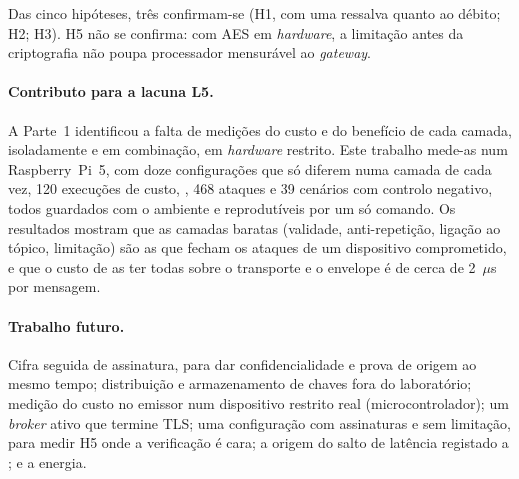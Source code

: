 
Das cinco hipóteses, três confirmam-se (H1, com uma ressalva quanto ao débito; H2;
H3).  H5 não se confirma: com
AES em \emph{hardware}, a limitação antes da criptografia não poupa processador
mensurável ao \emph{gateway}.

\paragraph{Contributo para a lacuna L5.} A Parte~1 identificou a falta de medições
do custo e do benefício de cada camada, isoladamente e em combinação, em
\emph{hardware} restrito. Este trabalho mede-as num Raspberry~Pi~5, com doze
configurações que só diferem numa camada de cada vez, 120 execuções de custo, , 468 ataques e 39 cenários com controlo negativo,
todos guardados com o ambiente e reprodutíveis por um só comando. Os resultados
mostram que as camadas baratas (validade, anti-repetição, ligação ao tópico,
limitação) são as que fecham os ataques de um dispositivo comprometido, e que o
custo de as ter todas sobre o transporte e o envelope é de cerca de 2~$\mu$s por
mensagem.

\paragraph{Trabalho futuro.} Cifra seguida de assinatura, para dar
confidencialidade e prova de origem ao mesmo tempo; distribuição e armazenamento
de chaves fora do laboratório; medição do custo no emissor num dispositivo
restrito real (microcontrolador);  um \emph{broker} ativo que termine TLS; uma
configuração com assinaturas e sem limitação, para medir H5 onde a verificação é
cara; a origem do salto de latência registado a ; e a energia.

